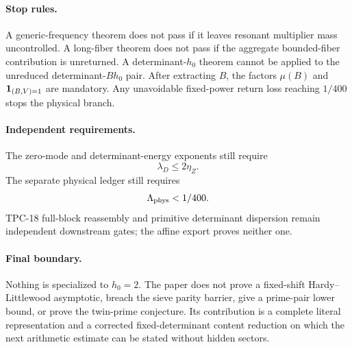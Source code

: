 \paragraph{Stop rules.}
A generic-frequency theorem does not pass if it leaves resonant
multiplier mass uncontrolled.  A long-fiber theorem does not pass if
the aggregate bounded-fiber contribution is unreturned.  A
determinant-\(h_0\) theorem cannot be applied to the unreduced
determinant-\(Bh_0\) pair.  After extracting \(B\), the factors
\(\mu(B)\) and \(\mathbf 1_{(B,V)=1}\) are mandatory.  Any unavoidable
fixed-power return loss reaching \(1/400\) stops the physical branch.

\paragraph{Independent requirements.}
The zero-mode and determinant-energy exponents still require
\[
 \lambda_D\le2\eta_Z.
\]
The separate physical ledger still requires
\[
 \Lambda_{\rm phys}<1/400.
\]
TPC-18 full-block reassembly and primitive determinant dispersion
remain independent downstream gates; the affine export proves
neither one.

\paragraph{Final boundary.}
Nothing is specialized to \(h_0=2\).  The paper does not prove a
fixed-shift Hardy--Littlewood asymptotic, breach the sieve parity
barrier, give a prime-pair lower bound, or prove the twin-prime
conjecture.  Its contribution is a complete literal representation
and a corrected fixed-determinant content reduction on which the next
arithmetic estimate can be stated without hidden sectors.
